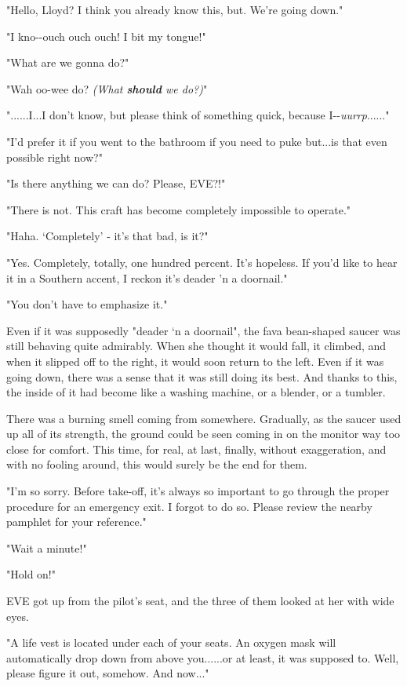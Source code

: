 \documentclass[
]{article}
\begin{document}
"Hello, Lloyd? I think you already know this, but. We're going down."

"I kno-\/-ouch ouch ouch! I bit my tongue!"

"What are we gonna do?"

"Wah oo-wee do? \emph{(What \textbf{should} we do?)}"

"......I...I don't know, but please think of something quick, because
I-\/-\emph{uurrp}......"

"I'd prefer it if you went to the bathroom if you need to puke but...is
that even possible right now?"

"Is there anything we can do? Please, EVE?!"

"There is not. This craft has become completely impossible to operate."

"Haha. `Completely' - it's that bad, is it?"

"Yes. Completely, totally, one hundred percent. It's hopeless. If you'd
like to hear it in a Southern accent, I reckon it's deader 'n a
doornail."

"You don't have to emphasize it."

Even if it was supposedly "deader `n a doornail", the fava bean-shaped
saucer was still behaving quite admirably. When she thought it would
fall, it climbed, and when it slipped off to the right, it would soon
return to the left. Even if it was going down, there was a sense that it
was still doing its best. And thanks to this, the inside of it had
become like a washing machine, or a blender, or a tumbler.

There was a burning smell coming from somewhere. Gradually, as the
saucer used up all of its strength, the ground could be seen coming in
on the monitor way too close for comfort. This time, for real, at last,
finally, without exaggeration, and with no fooling around, this would
surely be the end for them.

"I'm so sorry. Before take-off, it's always so important to go through
the proper procedure for an emergency exit. I forgot to do so. Please
review the nearby pamphlet for your reference."

"Wait a minute!"

"Hold on!"

EVE got up from the pilot's seat, and the three of them looked at her
with wide eyes.

"A life vest is located under each of your seats. An oxygen mask will
automatically drop down from above you......or at least, it was supposed
to. Well, please figure it out, somehow. And now..."
\end{document}
